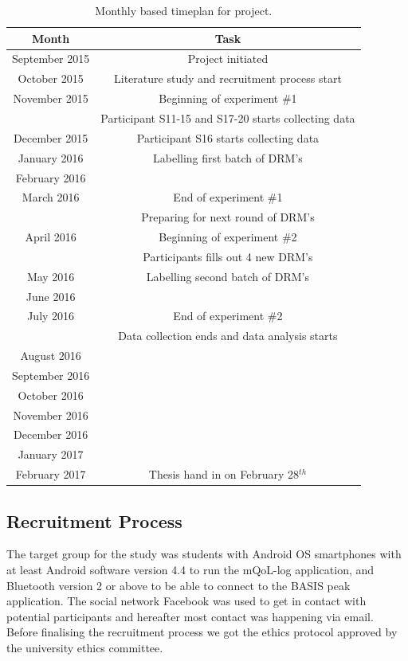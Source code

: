 \documentclass[12pt]{article} %
\begin{document}
\begin{table}[H]
\center
\begin{footnotesize}
	\begin{tabular}{| c | c |}
	\hline
	\textbf{Month} & \textbf{Task} \\
	\hline
	September 2015 & Project initiated\\
	October 2015 & Literature study and recruitment process start\\
	November 2015 & Beginning of experiment \#1 \\
	 & Participant S11-15 and S17-20 starts collecting data \\
	December 2015 & Participant S16 starts collecting data\\
	January 2016 & Labelling first batch of DRM's \\
	February 2016 & \\
	March 2016 & End of experiment \#1 \\
	 & Preparing for next round of DRM's \\
	April 2016 & Beginning of experiment \#2 \\
	 & Participants fills out 4 new DRM's \\
	May 2016 & Labelling second batch of DRM's\\
	June 2016 & \\
	July 2016 & End of experiment \#2 \\
	 & Data collection ends and data analysis starts\\
	August 2016 & \\
	September 2016 & \\
	October 2016 & \\
	November 2016 & \\
	December 2016 & \\
	January 2017 & \\
	February 2017 & Thesis hand in on February 28$^{th}$\\
	\hline
	\end{tabular}
	\caption{Monthly based timeplan for project.}
	\label{tab:timeplan}
\end{footnotesize}
\end{table}

\subsection{Recruitment Process}
The target group for the study was students with Android OS smartphones with at least Android software version 4.4 to run the mQoL-log application, and Bluetooth version 2 or above to be able to connect to the BASIS peak application. The social network Facebook was used to get in contact with potential participants and hereafter most contact was happening via email. Before finalising the recruitment process we got the ethics protocol approved by the university ethics committee.
\end{document}
